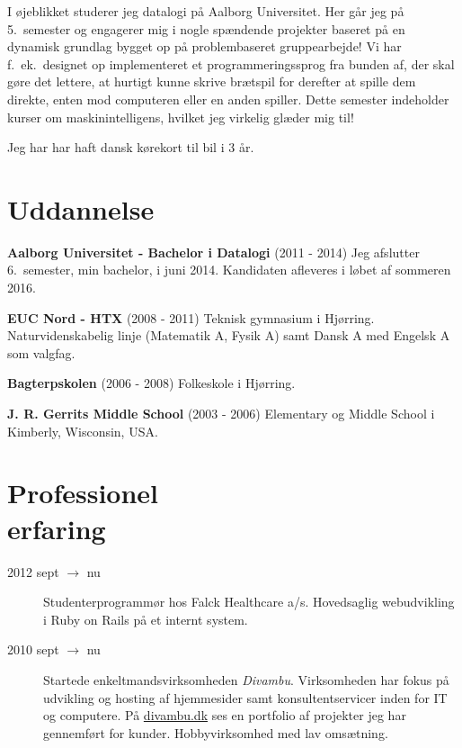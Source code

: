 \documentclass[margin,line,a4paper]{resume}
\begin{document}
\begin{resume}
    I øjeblikket studerer jeg datalogi på Aalborg Universitet. Her går
    jeg på 5.\ semester og engagerer mig i nogle spændende projekter
    baseret på en dynamisk grundlag bygget op på problembaseret
    gruppearbejde! Vi har f.\ ek.\ designet op implementeret et
    programmeringssprog fra bunden af, der skal gøre det lettere, at
    hurtigt kunne skrive brætspil for derefter at spille dem direkte,
    enten mod computeren eller en anden spiller. Dette semester
    indeholder kurser om maskinintelligens, hvilket jeg virkelig glæder
    mig til!

    Jeg har har haft dansk kørekort til bil i 3 år.

    \section{\mysidestyle Uddannelse}
    \textbf{Aalborg Universitet - Bachelor i Datalogi}
      (2011 - 2014) Jeg afslutter 6.\ semester, min bachelor, i juni
      2014. Kandidaten afleveres i løbet af sommeren 2016.

    \textbf{EUC Nord - HTX} (2008 - 2011) Teknisk gymnasium i Hjørring. Naturvidenskabelig
    linje (Matematik A, Fysik A) samt Dansk A med Engelsk A som valgfag.

    \textbf{Bagterpskolen} (2006 - 2008) Folkeskole i Hjørring.

    \textbf{J. R. Gerrits Middle School}
    (2003 - 2006) Elementary og Middle School i Kimberly,
    Wisconsin, USA.

\section{\mysidestyle Professionel\\erfaring}\vspace{1mm}
\begin{description}

  \item[2012 sept $\rightarrow$ nu] Studenterprogrammør hos Falck
    Healthcare a/s. Hovedsaglig webudvikling i Ruby on Rails på et internt
    system.

  \item[2010 sept $\rightarrow$ nu] Startede enkeltmandsvirksomheden
    \emph{Divambu}. Virksomheden har fokus på udvikling og hosting af
    hjemmesider samt konsultentservicer inden for IT og computere. På
    \url{divambu.dk} ses en portfolio af projekter jeg har gennemført for
    kunder. Hobbyvirksomhed med lav omsætning.


\end{description}
\end{resume}
\end{document}
